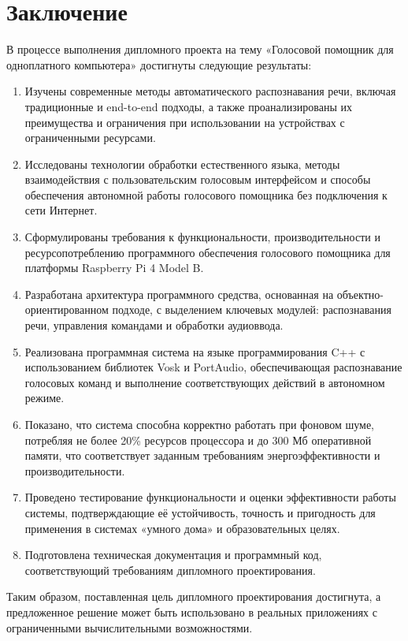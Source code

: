 \section*{Заключение}

В процессе выполнения дипломного проекта на тему «Голосовой помощник для одноплатного компьютера» достигнуты следующие результаты:

\begin{enumerate}
	\item Изучены современные методы автоматического распознавания речи, включая традиционные и end-to-end подходы, а также проанализированы их преимущества и ограничения при использовании на устройствах с ограниченными ресурсами.
	\item Исследованы технологии обработки естественного языка, методы взаимодействия с пользовательским голосовым интерфейсом и способы обеспечения автономной работы голосового помощника без подключения к сети Интернет.
	\item Сформулированы требования к функциональности, производительности и ресурсопотреблению программного обеспечения голосового помощника для платформы Raspberry Pi 4 Model B.
	\item Разработана архитектура программного средства, основанная на объектно-ориентированном подходе, с выделением ключевых модулей: распознавания речи, управления командами и обработки аудиоввода.
	\item Реализована программная система на языке программирования C++ с использованием библиотек Vosk и PortAudio, обеспечивающая распознавание голосовых команд и выполнение соответствующих действий в автономном режиме.
	\item Показано, что система способна корректно работать при фоновом шуме, потребляя не более 20\% ресурсов процессора и до 300 Мб оперативной памяти, что соответствует заданным требованиям энергоэффективности и производительности.
	\item Проведено тестирование функциональности и оценки эффективности работы системы, подтверждающие её устойчивость, точность и пригодность для применения в системах «умного дома» и образовательных целях.
	\item Подготовлена техническая документация и программный код, соответствующий требованиям дипломного проектирования.
\end{enumerate}

Таким образом, поставленная цель дипломного проектирования достигнута, а предложенное решение может быть использовано в реальных приложениях с ограниченными вычислительными возможностями.


